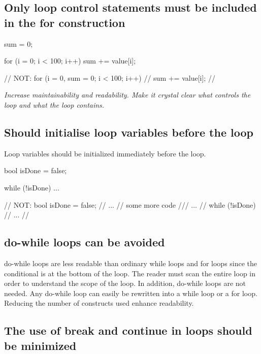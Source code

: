 \documentclass[a4paper,11pt,oneside]{scrbook}
\newcommand{\guideline}[1]{{\subsection{#1}}}
\newcommand{\motivation}[1]{{\normalfont \itshape #1}}
\newcommand{\trcode}[1]{{\normalfont \ttfamily #1}}
\begin{document}
\guideline{Only loop control statements must be included in the \trcode{for} construction}

\begin{code}
  sum = 0;

  for (i = 0; i < 100; i++) {
    sum += value[i];
  }

  // NOT: for (i = 0, sum = 0; i < 100; i++) {
  //        sum += value[i];
  //      }
\end{code}

\motivation{
  Increase maintainability and readability. Make it crystal clear what
  controls the loop and what the loop contains.
}

\guideline{Should initialise loop variables before the loop}

Loop variables should be initialized immediately before the loop.

\begin{code}
  bool isDone = false;

  while (!isDone) {
    ...
  }

  // NOT: bool isDone = false;
  //      ...
  //      some more code
  ///     ...
  //      while (!isDone) {
  //        ...
  //      } 
\end{code}

\guideline{\trcode{do-while} loops can be avoided}

do-while loops are less readable than ordinary while loops and for
loops since the conditional is at the bottom of the loop. The reader
must scan the entire loop in order to understand the scope of the
loop.  In addition, \trcode{do-while} loops are not needed. Any
\trcode{do-while} loop can easily be rewritten into a \trcode{while}
loop or a \trcode{for} loop. Reducing the number of constructs used
enhance readability.

\guideline{The use of \trcode{break} and \trcode{continue} in loops should be minimized}
\end{document}
